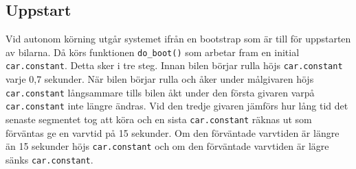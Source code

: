 \subsection{Uppstart} 
\label{sec:systembeskrivning:uppstart}
Vid autonom körning utgår systemet ifrån en bootstrap som är till för uppstarten av bilarna. Då körs funktionen \texttt{do\_boot()} som arbetar fram en
initial \texttt{car.constant}. Detta sker i tre steg. Innan bilen börjar rulla
höjs \texttt{car.constant} varje 0,7 sekunder. När bilen börjar rulla och åker
under målgivaren höjs \texttt{car.constant} långsammare tills bilen åkt under
den första givaren varpå \texttt{car.constant} inte längre ändras. Vid den
tredje givaren jämförs hur lång tid det senaste segmentet tog att köra och en
sista \texttt{car.constant} räknas ut som förväntas ge en varvtid på 15
sekunder. Om den förväntade varvtiden är längre än 15 sekunder höjs
\texttt{car.constant} och om den förväntade varvtiden är lägre sänks
\texttt{car.constant}.
